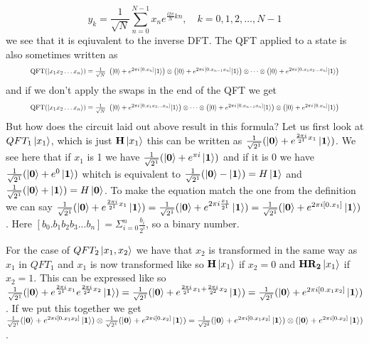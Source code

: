 $$y_{k}={\frac {1}{\sqrt {N}}}\sum _{n=0}^{N-1}x_{n}e^{{\frac {i2\pi }{N}}kn},\quad k=0,1,2,\ldots ,N-1$$
we see that it is eqiuvalent to the inverse DFT.
The QFT applied to a state is also sometimes written as 
\begin{equation*}
\resizebox{.9\hsize}{!}{${\text{QFT}}(|x_{1}x_{2}\ldots x_{n}\rangle )={\frac {1}{\sqrt {N}}}\ \left(|0\rangle +e^{2\pi i\,[0.x_{n}]}|1\rangle \right)\otimes \left(|0\rangle +e^{2\pi i\,[0.x_{n-1}x_{n}]}|1\rangle \right)\otimes \cdots \otimes \left(|0\rangle +e^{2\pi i\,[0.x_{1}x_{2}\ldots x_{n}]}|1\rangle \right)$}
\end{equation*}
and if we don't apply the swaps in the end of the QFT we get 
\begin{equation*}
\resizebox{.9\hsize}{!}{${\text{QFT}}(|x_{1}x_{2}\ldots x_{n}\rangle )={\frac {1}{\sqrt {N}}}\ \left(|0\rangle +e^{2\pi i\,[0.x_{1}x_{2}\ldots x_{n}]}|1\rangle \right)\otimes \cdots \otimes \left(|0\rangle +e^{2\pi i\,[0.x_{n-1}x_{n}]}|1\rangle \right)\otimes \left(|0\rangle +e^{2\pi i\,[0.x_{n}]}|1\rangle \right)$}
\end{equation*}
But how does the circuit laid out above result in this formula?
Let us first look at $QFT_1\ket{x_1}$, which is just $\mathbf{H}\ket{x_1}$ this can be written as $\frac{1}{\sqrt{2^1}}(\ket{\mathbf{0}}+e^{\frac{2\pi i}{2^1}x_1}\ket{\mathbf{1}})$.
We see here that if $x_1$ is 1 we have $\frac{1}{\sqrt{2^1}}(\ket{\mathbf{0}}+e^{\pi i}\ket{\mathbf{1}})$ and if it is 0 we have $\frac{1}{\sqrt{2^1}}(\ket{\mathbf{0}}+e^{0}\ket{\mathbf{1}})$ whitch is equivalent to $\frac{1}{\sqrt{2^1}}(\ket{\mathbf{0}}-\ket{\mathbf{1}})=H\ket{\mathbf{1}}$ and $\frac{1}{\sqrt{2^1}}(\ket{\mathbf{0}}+\ket{\mathbf{1}})=H\ket{\mathbf{0}}$. 
To make the equation match the one from the definition we can say $\frac{1}{\sqrt{2^1}}(\ket{\mathbf{0}}+e^{\frac{2\pi i}{2^1}x_1}\ket{\mathbf{1}})=\frac{1}{\sqrt{2^1}}(\ket{\mathbf{0}}+e^{2\pi i\frac{x_1}{2^1}}\ket{\mathbf{1}})=\frac{1}{\sqrt{2^1}}(\ket{\mathbf{0}}+e^{2\pi i[0.x_1]}\ket{\mathbf{1}})$. 
Here $[b_0.b_1b_2b_3...b_n]=\Sigma^{n}_{i=0}\frac{b_i}{2^i}$, so a binary number.  


For the case of $QFT_2\ket{x_1,x_2}$ we have that $x_2$ is transformed in the same way as $x_1$ in $QFT_1$ and $x_1$ is now transformed like so $\mathbf{H}\ket{x_1}$ if $x_2=0$ and $\mathbf{H}\mathbf{R_{2}}\ket{x_1}$ if $x_2=1$. 
This can be expressed like so 
$\frac{1}{\sqrt{2^1}}(\ket{\mathbf{0}}+e^{\frac{2\pi i}{2^1}x_1}e^{\frac{2\pi i}{2^2}x_2}\ket{\mathbf{1}})= \frac{1}{\sqrt{2^1}}(\ket{\mathbf{0}}+e^{\frac{2\pi i}{2^1}x_1+\frac{2\pi i}{2^2}x_2}\ket{\mathbf{1}})=\frac{1}{\sqrt{2^1}}(\ket{\mathbf{0}}+e^{2\pi i[0.x_1x_2]}\ket{\mathbf{1}})$. 
If we put this together we get $\frac{1}{\sqrt{2^1}}(\ket{\mathbf{0}}+e^{2\pi i[0.x_1x_2]}\ket{\mathbf{1}})\otimes \frac{1}{\sqrt{2^1}}(\ket{\mathbf{0}}+e^{2\pi i[0.x_2]}\ket{\mathbf{1}})=\frac{1}{\sqrt{2^2}}(\ket{\mathbf{0}}+e^{2\pi i[0.x_1x_2]}\ket{\mathbf{1}})\otimes(\ket{\mathbf{0}}+e^{2\pi i[0.x_2]}\ket{\mathbf{1}})$. 

